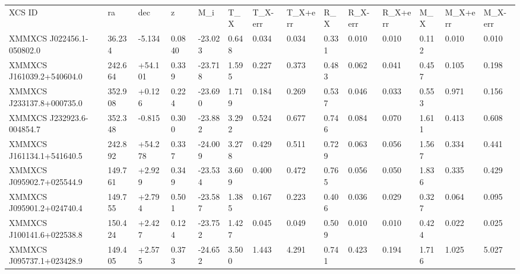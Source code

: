 \begin{tabular}{l|l|l|l|l|l|l|l}
XCS ID                    & ra              & dec             & z      & M_i                & T_X     & T_X-err      & T_X+err      & R_X       & R_X-err     & R_X+err     & M_X       & M_X+err     & M_X-err     \\
XMMXCS J022456.1-050802.0 & 36.234          & -5.134          & 0.0840 & -23.023            & 0.648   & 0.034        & 0.034        & 0.331     & 0.010       & 0.010       & 0.112     & 0.010       & 0.010       \\
XMMXCS J161039.2+540604.0 & 242.664         & +54.101         & 0.339  & -23.718            & 1.595   & 0.227        & 0.373        & 0.483     & 0.062       & 0.041       & 0.457     & 0.105       & 0.198       \\
XMMXCS J233137.8+000735.0 & 352.908         & +0.126          & 0.224  & -23.690            & 1.719   & 0.184        & 0.269        & 0.537     & 0.046       & 0.033       & 0.553     & 0.971       & 0.156       \\
XMMXCS J232923.6-004854.7 & 352.348         & -0.815          & 0.300  & -23.882            & 3.292   & 0.524        & 0.677        & 0.746     & 0.084       & 0.070       & 1.611     & 0.413       & 0.608       \\
XMMXCS J161134.1+541640.5 & 242.892         & +54.278         & 0.337  & -24.009            & 3.278   & 0.429        & 0.511        & 0.729     & 0.063       & 0.056       & 1.567     & 0.334       & 0.441       \\
XMMXCS J095902.7+025544.9 & 149.761         & +2.929          & 0.349  & -23.534            & 3.609   & 0.400        & 0.472        & 0.765     & 0.056       & 0.050       & 1.836     & 0.335       & 0.429       \\
XMMXCS J095901.2+024740.4 & 149.755         & +2.794          & 0.501  & -23.587            & 1.385   & 0.167        & 0.223        & 0.406     & 0.036       & 0.029       & 0.327     & 0.064       & 0.095       \\
XMMXCS J100141.6+022538.8 & 150.424         & +2.427          & 0.124  & -23.752            & 1.427   & 0.045        & 0.049        & 0.509     & 0.010       & 0.010       & 0.424     & 0.022       & 0.025       \\
XMMXCS J095737.1+023428.9 & 149.405         & +2.575          & 0.373  & -24.652            & 3.500   & 1.443        & 4.291        & 0.741     & 0.423       & 0.194       & 1.716     & 1.025       & 5.027       \\

\end{tabular}
